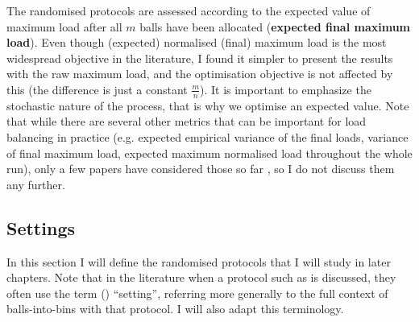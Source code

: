 \begin{itemize}
    The randomised protocols are assessed according to the expected value of maximum load after all $m$ balls have been allocated (\textbf{expected final maximum load}). Even though (expected) normalised (final) maximum load is the most widespread objective in the literature, I found it simpler to present the results with the raw maximum load, and the optimisation objective is not affected by this (the difference is just a constant $\frac{m}{n}$). It is important to emphasize the stochastic nature of the process, that is why we optimise an expected value. Note that while there are several other metrics that can be important for load balancing in practice (e.g. expected empirical variance of the final loads, variance of final maximum load, expected maximum normalised load throughout the whole run), only a few papers have considered those so far \cite{feldheim2021longtermthinning}, so I do not discuss them any further. 
    
\end{itemize}





\subsection{Settings} \label{settings}

In this section I will define the randomised protocols that I will study in later chapters. Note that in the literature when a protocol such as \TwoThinning is discussed, they often use the term (\TwoThinning) ``setting'', referring more generally to the full context of balls-into-bins with that protocol. I will also adapt this terminology.

\paragraph{\OneChoice}

